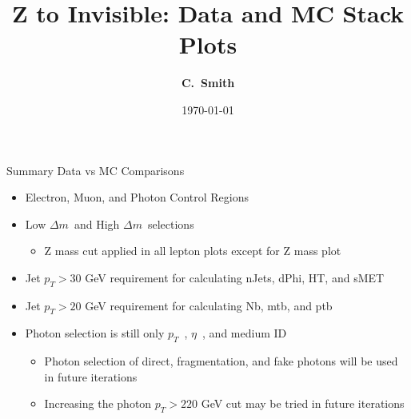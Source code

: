 \documentclass[10pt,xcolor=svgnames,fleqn,aspectratio=169]{beamer}
\title{Z to Invisible: Data and MC Stack Plots}
\author{\textcolor{DodgerBlueDark}{\bf C.~Smith\inst{1}}}
\institute{\inst{1} Baylor}
\date{\today}
\newcommand{\dm}{$\Delta m$~}
\newcommand{\pt}{$p_{T}$~}
\newcommand{\texeta}{$\eta$~}
\begin{document}
\begin{frame}[plain]
\maketitle
\end{frame}

\begin{frame}{Summary}
Data vs MC Comparisons
\begin{itemize}
\item Electron, Muon, and Photon Control Regions
\item Low \dm and High \dm selections
\begin{itemize}
\item Z mass cut applied in all lepton plots except for Z mass plot
\end{itemize}
\item Jet $p_T > 30$ GeV requirement for calculating nJets, dPhi, HT, and sMET
\item Jet $p_T > 20$ GeV requirement for calculating Nb, mtb, and ptb
\item Photon selection is still only \pt, \texeta, and medium ID
\begin{itemize}
\item Photon selection of direct, fragmentation, and fake photons will be used in future iterations
\item Increasing the photon $p_{T} > 220$ GeV cut may be tried in future iterations
\end{itemize}
\end{itemize}
\end{frame}




\end{document}
